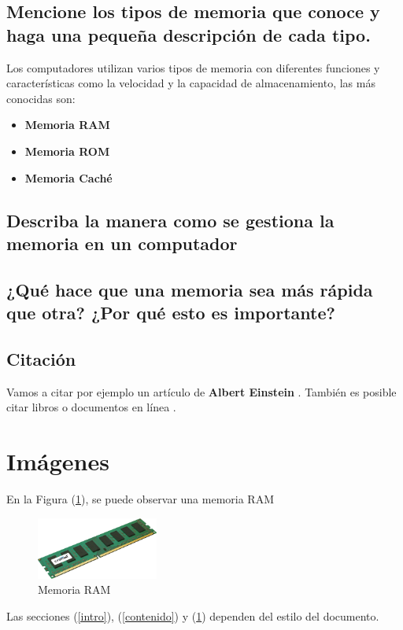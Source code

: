 \documentclass{article}
\begin{document}
\subsection{Mencione los tipos de memoria que conoce y haga una pequeña descripción de cada tipo.}
Los computadores utilizan varios tipos de memoria con diferentes funciones y características como la velocidad y la capacidad de almacenamiento, las más conocidas son:
\begin{itemize}
    \item \textbf{Memoria RAM}
    \item \textbf{Memoria ROM}
    \item \textbf{Memoria Caché}
    
\end{itemize}


\subsection{Describa la manera como se gestiona la memoria en un computador}


\subsection{¿Qué hace que una memoria sea más rápida que otra? ¿Por qué esto es importante?}
 \subsection{ Citación}
 
Vamos a citar por ejemplo un artículo de \textbf{Albert Einstein} \cite{einstein}.
También es posible citar libros \cite{dirac} o documentos en línea \cite{knuthwebsite}.

\section{Imágenes} \label{imagenes}

En la Figura (\ref{fig:memoria}), se puede observar una memoria RAM

\begin{figure}[h]
\includegraphics[width=4cm]{memoria.png}
\centering
\caption{Memoria RAM}
\label{fig:memoria}
\end{figure}

Las secciones (\ref{intro}), (\ref{contenido}) y (\ref{imagenes}) dependen del estilo del documento.


\end{document}
